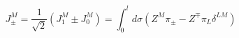 \begin{equation}
    J^M_\pm = \frac{1}{\sqrt{2}}\left(J^M_1 \pm J^M_0 \right) =
             \int_0^l d\sigma \left(
              Z^M \pi_\pm - Z^\mp \pi_L \delta^{LM} \right)
\end{equation}

